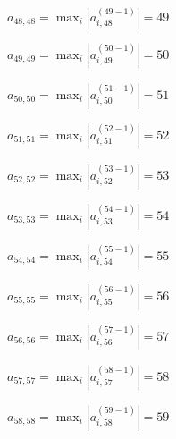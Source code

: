 \documentclass[a4paper,12pt]{article}
\begin{document}
$a _{ 48, 48 } =  \max _i |a _{ i, 48 } ^{ (49 - 1) } | = 49$

$a _{ 49, 49 } =  \max _i |a _{ i, 49 } ^{ (50 - 1) } | = 50$

$a _{ 50, 50 } =  \max _i |a _{ i, 50 } ^{ (51 - 1) } | = 51$

$a _{ 51, 51 } =  \max _i |a _{ i, 51 } ^{ (52 - 1) } | = 52$

$a _{ 52, 52 } =  \max _i |a _{ i, 52 } ^{ (53 - 1) } | = 53$

$a _{ 53, 53 } =  \max _i |a _{ i, 53 } ^{ (54 - 1) } | = 54$

$a _{ 54, 54 } =  \max _i |a _{ i, 54 } ^{ (55 - 1) } | = 55$

$a _{ 55, 55 } =  \max _i |a _{ i, 55 } ^{ (56 - 1) } | = 56$

$a _{ 56, 56 } =  \max _i |a _{ i, 56 } ^{ (57 - 1) } | = 57$

$a _{ 57, 57 } =  \max _i |a _{ i, 57 } ^{ (58 - 1) } | = 58$

$a _{ 58, 58 } =  \max _i |a _{ i, 58 } ^{ (59 - 1) } | = 59$
\end{document}
